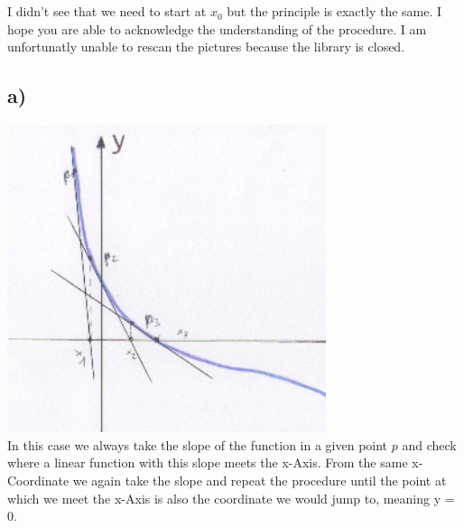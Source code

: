 \documentclass[12pt,a4paper]{scrartcl}
\begin{document}
	
\section{}
	I didn't see that we need to start at $x_0$ but the principle is exactly the same. I hope you are able to acknowledge the understanding of the procedure. I am unfortunatly unable to rescan the pictures because the library is closed. 
	\subsection*{a)}
		\includegraphics[width = 0.7\textwidth]{figure_1a.png} \\
		In this case we always take the slope of the function in a given point $p$ and check where a linear function with this slope meets the x-Axis. From the same x-Coordinate we again take the slope and repeat the procedure until the point at which we meet the x-Axis is also the coordinate we would jump to, meaning y = 0.
\end{document}
